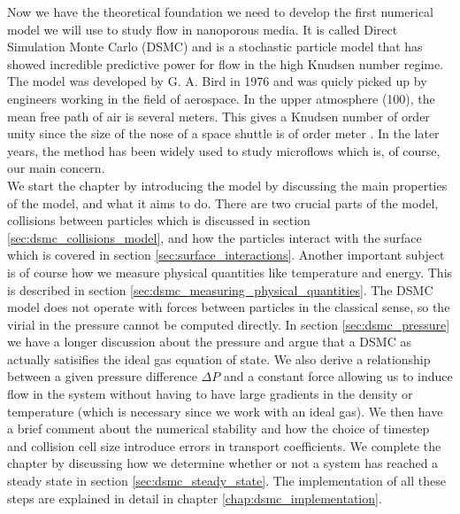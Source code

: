 Now we have the theoretical foundation we need to develop the first numerical model we will use to study flow in nanoporous media. It is called Direct Simulation Monte Carlo (DSMC) and is a stochastic particle model that has showed incredible predictive power for flow in the high Knudsen number regime. The model was developed by G. A. Bird in 1976 and was quicly picked up by engineers working in the field of aerospace. In the upper atmosphere (\unit{100}{\kilo\meter}), the mean free path of air is several meters. This gives a Knudsen number of order unity since the size of the nose of a space shuttle is of order meter \cite{alexander1997direct}. In the later years, the method has been widely used to study microflows which is, of course, our main concern.\\
We start the chapter by introducing the model by discussing the main properties of the model, and what it aims to do. There are two crucial parts of the model, collisions between particles which is discussed in section \ref{sec:dsmc_collisions_model}, and how the particles interact with the surface which is covered in section \ref{sec:surface_interactions}. Another important subject is of course how we measure physical quantities like temperature and energy. This is described in section \ref{sec:dsmc_measuring_physical_quantities}. The DSMC model does not operate with forces between particles in the classical sense, so the virial in the pressure cannot be computed directly. In section \ref{sec:dsmc_pressure} we have a longer discussion about the pressure and argue that a DSMC as actually satisifies the ideal gas equation of state. We also derive a relationship between a given pressure difference $\Delta P$ and a constant force allowing us to induce flow in the system without having to have large gradients in the density or temperature (which is necessary since we work with an ideal gas). We then have a brief comment about the numerical stability and how the choice of timestep and collision cell size introduce errors in transport coefficients. We complete the chapter by discussing how we determine whether or not a system has reached a steady state in section \ref{sec:dsmc_steady_state}. The implementation of all these steps are explained in detail in chapter \ref{chap:dsmc_implementation}.